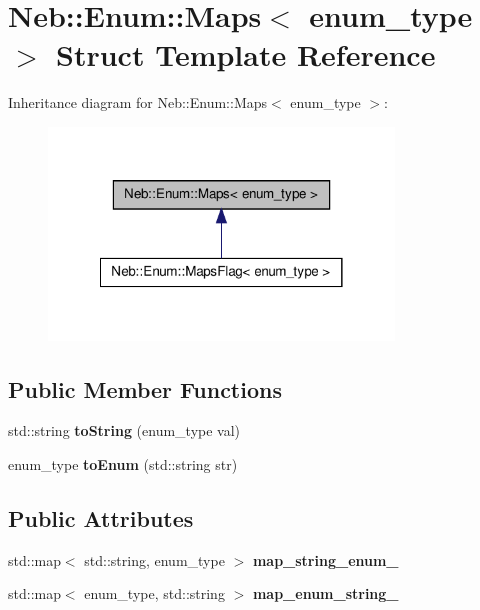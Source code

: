 \hypertarget{structNeb_1_1Enum_1_1Maps}{\section{\-Neb\-:\-:\-Enum\-:\-:\-Maps$<$ enum\-\_\-type $>$ \-Struct \-Template \-Reference}
\label{structNeb_1_1Enum_1_1Maps}
}


\-Inheritance diagram for \-Neb\-:\-:\-Enum\-:\-:\-Maps$<$ enum\-\_\-type $>$\-:
\nopagebreak
\begin{figure}[H]
\begin{center}
\leavevmode
\includegraphics[width=260pt]{structNeb_1_1Enum_1_1Maps__inherit__graph}
\end{center}
\end{figure}
\subsection*{\-Public \-Member \-Functions}
\begin{DoxyCompactItemize}
\item 
\hypertarget{structNeb_1_1Enum_1_1Maps_ac9e855809a6118d50ca6d0b9a24f80a9}{std\-::string {\bfseries to\-String} (enum\-\_\-type val)}\label{structNeb_1_1Enum_1_1Maps_ac9e855809a6118d50ca6d0b9a24f80a9}

\item 
\hypertarget{structNeb_1_1Enum_1_1Maps_a716d4db5d843605cdf44a9687aca4779}{enum\-\_\-type {\bfseries to\-Enum} (std\-::string str)}\label{structNeb_1_1Enum_1_1Maps_a716d4db5d843605cdf44a9687aca4779}

\end{DoxyCompactItemize}
\subsection*{\-Public \-Attributes}
\begin{DoxyCompactItemize}
\item 
\hypertarget{structNeb_1_1Enum_1_1Maps_ad09edc976795064126040e7450a717e0}{std\-::map$<$ std\-::string, enum\-\_\-type $>$ {\bfseries map\-\_\-string\-\_\-enum\-\_\-}}\label{structNeb_1_1Enum_1_1Maps_ad09edc976795064126040e7450a717e0}

\item 
\hypertarget{structNeb_1_1Enum_1_1Maps_a6dadfc6e102d6a2c01a42fb91aed2bb9}{std\-::map$<$ enum\-\_\-type, std\-::string $>$ {\bfseries map\-\_\-enum\-\_\-string\-\_\-}}\label{structNeb_1_1Enum_1_1Maps_a6dadfc6e102d6a2c01a42fb91aed2bb9}

\end{DoxyCompactItemize}
